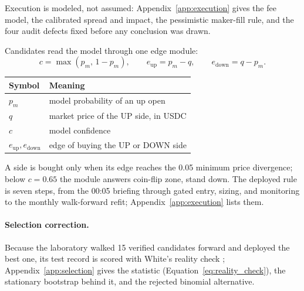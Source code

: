 Execution is modeled, not assumed: Appendix~\ref{app:execution} gives the
fee model, the calibrated spread and impact, the pessimistic maker-fill
rule, and the four audit defects fixed before any conclusion was drawn.

Candidates read the model through one edge module:
\begin{equation}
c = \max(p_m,\, 1 - p_m), \qquad
e_{\mathrm{up}} = p_m - q, \qquad
e_{\mathrm{down}} = q - p_m.
\label{eq:edge}
\end{equation}

\begin{center}
\small
\begin{tabular}{ll}
\toprule
Symbol & Meaning \\
\midrule
$p_m$ & model probability of an up open \\
$q$ & market price of the UP side, in USDC \\
$c$ & model confidence \\
$e_{\mathrm{up}}, e_{\mathrm{down}}$ & edge of buying the UP or DOWN side \\
\bottomrule
\end{tabular}
\end{center}

A side is bought only when its edge reaches the 0.05 minimum price
divergence; below $c = 0.65$ the module answers coin-flip zone, stand
down. The deployed rule is seven steps, from the 00:05 briefing through
gated entry, sizing, and monitoring to the monthly walk-forward refit;
Appendix~\ref{app:execution} lists them.

\paragraph{Selection correction.}
Because the laboratory walked 15 verified candidates forward and deployed
the best one, its test record is scored with White's reality check
\citep{white2000reality}; Appendix~\ref{app:selection} gives the statistic
(Equation~\ref{eq:reality_check}), the stationary bootstrap behind it, and
the rejected binomial alternative.
